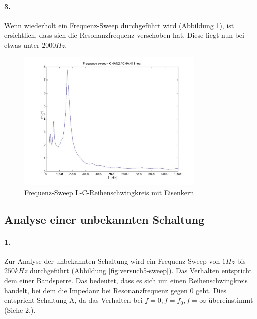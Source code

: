 \documentclass[a4paper]{article}
\begin{document}
\paragraph{3.}
Wenn wiederholt ein Frequenz-Sweep durchgeführt wird (Abbildung \ref{fig:versuch4-eisenkern-sweep}), ist ersichtlich, dass sich die Resonanzfrequenz verschoben hat. Diese liegt nun bei etwas unter $2000\si{Hz}$.

\begin{figure}[H]
    \centering
    \includegraphics[width=0.8\textwidth]{versuch4_eisenkern_sweep_ylinxlin.jpg}
    \caption{Frequenz-Sweep L-C-Reihenschwingkreis mit Eisenkern}
    \label{fig:versuch4-eisenkern-sweep}
\end{figure}

\subsection{Analyse einer unbekannten Schaltung}
\paragraph{1.}
Zur Analyse der unbekannten Schaltung wird ein Frequenz-Sweep von $1\si{Hz}$ bis $250\si{kHz}$ durchgeführt (Abbildung \ref{fig:versuch5-sweep}). Das Verhalten entspricht dem einer Bandsperre.
Das bedeutet, dass es sich um einen Reihenschwingkreis handelt, bei dem die Impedanz bei Resonanzfrequenz gegen 0 geht. Dies entspricht Schaltung A, da das Verhalten bei $f=0, f=f_0, f=\infty$ übereinstimmt (Siehe 2.).
\end{document}
